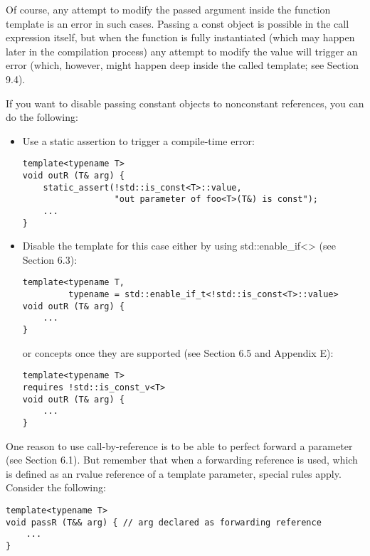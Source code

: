 Of course, any attempt to modify the passed argument inside the function template is an error in such cases. Passing a const object is possible in the call expression itself, but when the function is fully instantiated (which may happen later in the compilation process) any attempt to modify the value will trigger an error (which, however, might happen deep inside the called template; see Section 9.4).

If you want to disable passing constant objects to nonconstant references, you can do the following:

\begin{itemize}
\item 
Use a static assertion to trigger a compile-time error:

\begin{lstlisting}[style=styleCXX]
template<typename T>
void outR (T& arg) {
	static_assert(!std::is_const<T>::value,
				  "out parameter of foo<T>(T&) is const");
	...
}
\end{lstlisting}

\item 
Disable the template for this case either by using std::enable\_if<> (see Section 6.3):

\begin{lstlisting}[style=styleCXX]
template<typename T,
		 typename = std::enable_if_t<!std::is_const<T>::value>
void outR (T& arg) {
	...
}
\end{lstlisting}

or concepts once they are supported (see Section 6.5 and Appendix E):

\begin{lstlisting}[style=styleCXX]
template<typename T>
requires !std::is_const_v<T>
void outR (T& arg) {
	...
}
\end{lstlisting}

\end{itemize}


One reason to use call-by-reference is to be able to perfect forward a parameter (see Section 6.1). But remember that when a forwarding reference is used, which is defined as an rvalue reference of a template parameter, special rules apply. Consider the following:

\begin{lstlisting}[style=styleCXX]
template<typename T>
void passR (T&& arg) { // arg declared as forwarding reference
	...
}
\end{lstlisting}

